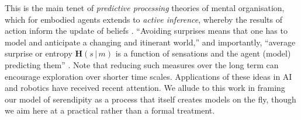 This is the main tenet of \emph{predictive
  processing} theories of mental organisation, which for embodied
agents extends to \emph{active inference}, whereby the results of
action inform the update of beliefs \cite{friston2016active}.  ``Avoiding surprises
means that one has to model and anticipate a changing and itinerant
world,'' and importantly, ``average surprise or entropy
$\mathbf{H}(s\,\vert\,m)$ is a function of sensations and the agent
(model) predicting them'' \cite{Friston2012}.  
Note that reducing such measures over the long term
can encourage exploration over shorter time scales.
Applications of these
ideas in AI and robotics have received recent attention.
We allude to
this work in framing our model of serendipity as a process that
itself creates models on the fly, though we aim here at a practical
rather than a formal treatment.





